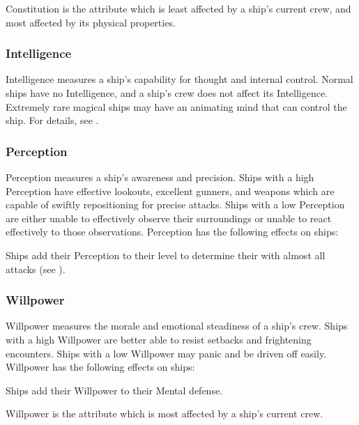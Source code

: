             Constitution is the attribute which is least affected by a ship's current crew, and most affected by its physical properties.

        \subsubsection{Intelligence}
            Intelligence measures a ship's capability for thought and internal control.
            Normal ships have no Intelligence, and a ship's crew does not affect its Intelligence.
            Extremely rare magical ships may have an animating mind that can control the ship.
            For details, see .

        \subsubsection{Perception}
            Perception measures a ship's awareness and precision.
            Ships with a high Perception have effective lookouts, excellent gunners, and weapons which are capable of swiftly repositioning for precise attacks.
            Ships with a low Perception are either unable to effectively observe their surroundings or unable to react effectively to those observations.
            Perception has the following effects on ships:
            \begin{raggeditemize}
                \item Ships add their Perception to their level to determine their  with almost all attacks (see ).
            \end{raggeditemize}

        \subsubsection{Willpower}
            Willpower measures the morale and emotional steadiness of a ship's crew.
            Ships with a high Willpower are better able to resist setbacks and frightening encounters.
            Ships with a low Willpower may panic and be driven off easily.
            Willpower has the following effects on ships:
            \begin{raggeditemize}
                \item Ships add their Willpower to their Mental defense.
            \end{raggeditemize}

            Willpower is the attribute which is most affected by a ship's current crew.

